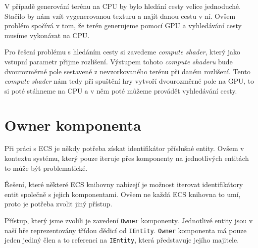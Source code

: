 V případě generování terénu na CPU by bylo hledání cesty velice jednoduché. Stačilo by nám vzít vygenerovanou texturu a najít danou cestu v ní. Ovšem problém spočívá v tom, že terén generujeme pomocí GPU a vyhledávání cesty musíme vykonávat na CPU.

Pro řešení problému s hledáním cesty si zavedeme \textit{compute shader}, který jako vstupní parametr přijme rozlišení. Výstupem tohoto \textit{compute shaderu} bude dvourozměrné pole sestavené z nevzorkovaného terénu při daném rozlišení. Tento \textit{compute shader} nám tedy při spuštění hry vytvoří dvourozměrné pole na GPU, to si poté stáhneme na CPU a v něm poté můžeme provádět vyhledávání cesty.




\section{Owner komponenta}
Při práci s ECS je někdy potřeba získat identifikátor příslušné entity. Ovšem v kontextu systému, který pouze iteruje přes komponenty na jednotlivých entitách to může být problematické.

Řešení, které některé ECS knihovny nabízejí je možnost iterovat identifikátory entit společně s jejich komponentami. Ovšem ne každá ECS knihovna to umí, proto je potřeba zvolit jiný přístup.

Přístup, který jsme zvolili je zavedení \texttt{Owner} komponenty. Jednotlivé entity jsou v naší hře reprezentovány třídou dědicí od \texttt{IEntity}. \texttt{Owner} komponenta má pouze jeden jediný člen a to referenci na \texttt{IEntity}, která představuje jejího majitele.











